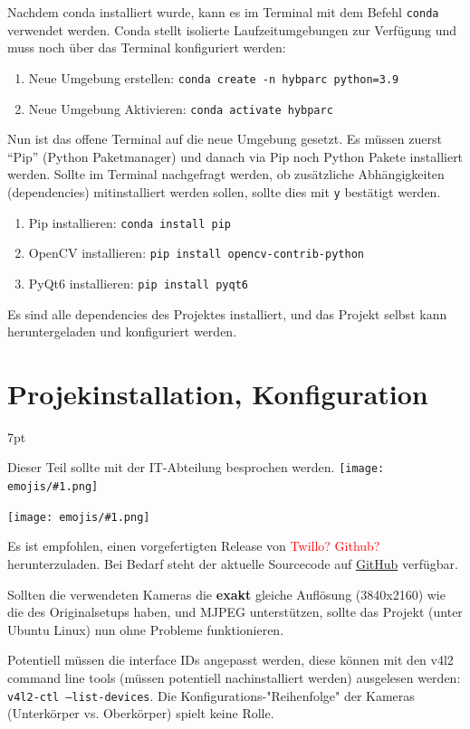 \documentclass[a4paper]{article}
\newcommand{\warn}[1]{\textcolor{red}{#1}}
\newcommand{\code}[1]{\texttt{#1}}
\newcommand{\emoji}[1]{
    \begingroup\normalfont
    \texttt{[image: emojis/\#1.png]}
    \endgroup
}
\newenvironment{formal}{%
    \def\FrameCommand{%
    \hspace{1pt}%
    {\color{coolpurple}\vrule width 2pt}%
    {\color{formalshade}\vrule width 4pt}%
    \colorbox{formalshade}%
    }%
    \MakeFramed{\advance\hsize-\width\FrameRestore}%
    \noindent\hspace{-4.55pt}%
    \begin{adjustwidth}{}{7pt}%
    \vspace{2pt}\vspace{2pt}%
}
{%
    \vspace{2pt}\end{adjustwidth}\endMakeFramed%
}
\begin{document}
Nachdem conda installiert wurde, kann es im Terminal mit dem Befehl \code{conda} verwendet werden. Conda stellt isolierte Laufzeitumgebungen zur Verfügung und muss noch über das Terminal konfiguriert werden:
\begin{enumerate}
    \item Neue Umgebung erstellen: \code{conda create -n hybparc python=3.9}
    \item Neue Umgebung Aktivieren: \code{conda activate hybparc}
\end{enumerate}

Nun ist das offene Terminal auf die neue Umgebung gesetzt. Es müssen zuerst \enquote{Pip} (Python Paketmanager) und danach via Pip noch Python Pakete installiert werden. Sollte im Terminal nachgefragt werden, ob zusätzliche Abhängigkeiten (dependencies) mitinstalliert werden sollen, sollte dies mit \code{y} bestätigt werden.

\begin{enumerate}
    \item Pip installieren: \code{conda install pip}
    \item OpenCV installieren: \code{pip install opencv-contrib-python}
    \item PyQt6 installieren: \code{pip install pyqt6}
\end{enumerate}

Es sind alle dependencies des Projektes installiert, und das Projekt selbst kann heruntergeladen und konfiguriert werden.


\section{Projekinstallation, Konfiguration}
\begin{formal}
    Dieser Teil sollte mit der IT-Abteilung besprochen werden.\emoji{technologist}\emoji{warning}
\end{formal}
Es ist empfohlen, einen vorgefertigten Release von \warn{Twillo? Github?} herunterzuladen. Bei Bedarf steht der aktuelle Sourcecode auf \href{https://github.com/leloomi/hybparc_aruco}{GitHub} verfügbar.

Sollten die verwendeten Kameras die \textbf{exakt} gleiche Auflösung (3840x2160) wie die des Originalsetups haben, und MJPEG unterstützen, sollte das Projekt (unter Ubuntu Linux) nun ohne Probleme funktionieren. 

Potentiell müssen die interface IDs angepasst werden, diese können mit den v4l2 command line tools (müssen potentiell nachinstalliert werden) ausgelesen werden: \code{v4l2-ctl --list-devices}. Die Konfigurations-"Reihenfolge" der Kameras (Unterkörper vs. Oberkörper) spielt keine Rolle.
\end{document}
